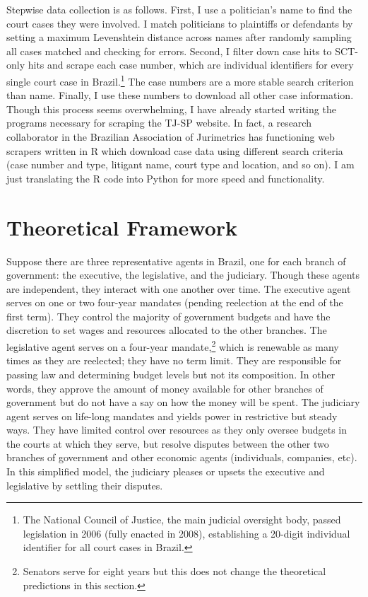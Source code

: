 \documentclass[11pt]{article}
\begin{document}
Stepwise data collection is as follows. First, I use a politician's name to find the court cases they were involved. I match politicians to plaintiffs or defendants by setting a maximum Levenshtein distance across names after randomly sampling all cases matched and checking for errors. Second, I filter down case hits to SCT-only hits and scrape each case number, which are individual identifiers for every single court case in Brazil.\footnote{The National Council of Justice, the main judicial oversight body, passed legislation in 2006 (fully enacted in 2008), establishing a 20-digit individual identifier for all court cases in Brazil.} The case numbers are a more stable search criterion than name. Finally, I use these numbers to download all other case information. Though this process seems overwhelming, I have already started writing the programs necessary for scraping the TJ-SP website. In fact, a research collaborator in the Brazilian Association of Jurimetrics has functioning web scrapers written in R which download case data using different search criteria (case number and type, litigant name, court type and location, and so on). I am just translating the R code into Python for more speed and functionality.

\section{Theoretical Framework} \label{sec:theory_paper2}

Suppose there are three representative agents in Brazil, one for each branch of government: the executive, the legislative, and the judiciary. Though these agents are independent, they interact with one another over time. The executive agent serves on one or two four-year mandates (pending reelection at the end of the first term). They control the majority of government budgets and have the discretion to set wages and resources allocated to the other branches. The legislative agent serves on a four-year mandate,\footnote{Senators serve for eight years but this does not change the theoretical predictions in this section.} which is renewable as many times as they are reelected; they have no term limit. They are responsible for passing law and determining budget levels but not its composition. In other words, they approve the amount of money available for other branches of government but do not have a say on how the money will be spent. The judiciary agent serves on life-long mandates and yields power in restrictive but steady ways. They have limited control over resources as they only oversee budgets in the courts at which they serve, but resolve disputes between the other two branches of government and other economic agents (individuals, companies, etc). In this simplified model, the judiciary pleases or upsets the executive and legislative by settling their disputes.
\end{document}
